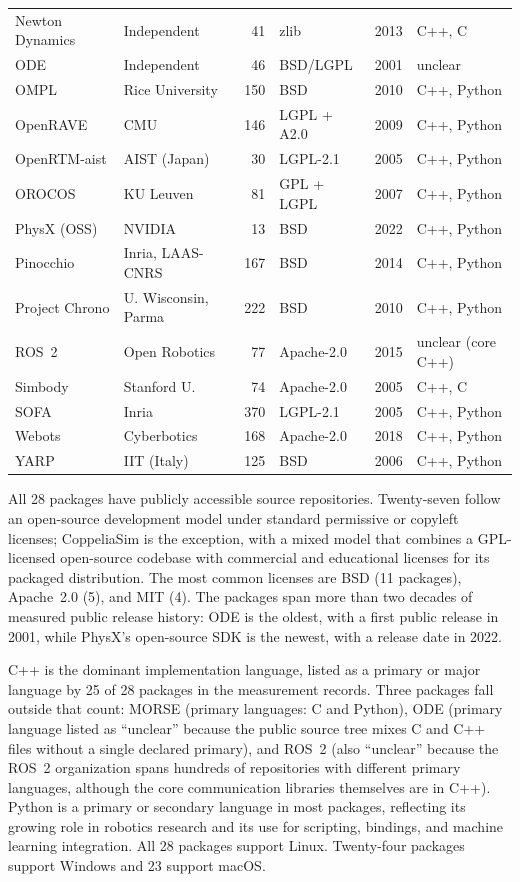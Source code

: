 \begin{longtable}{@{}P{2.2cm}P{2.7cm}rP{1.7cm}P{1.3cm}P{1.8cm}@{}}
Newton Dynamics & Independent & 41 & zlib & 2013 & C++, C \\
ODE & Independent & 46 & BSD/\allowbreak{}LGPL & 2001 & unclear \\
OMPL & Rice University & 150 & BSD & 2010 & C++, Python \\
OpenRAVE & CMU & 146 & LGPL + A2.0 & 2009 & C++, Python \\
OpenRTM-aist & AIST (Japan) & 30 & LGPL-2.1 & 2005 & C++, Python \\
OROCOS & KU Leuven & 81 & GPL + LGPL & 2007 & C++, Python \\
PhysX (OSS) & NVIDIA & 13 & BSD & 2022 & C++, Python \\
Pinocchio & Inria, LAAS-CNRS & 167 & BSD & 2014 & C++, Python \\
Project Chrono & U. Wisconsin, Parma & 222 & BSD & 2010 & C++, Python \\
ROS~2 & Open Robotics & 77 & Apache-2.0 & 2015 & unclear (core C++) \\
Simbody & Stanford U. & 74 & Apache-2.0 & 2005 & C++, C \\
SOFA & Inria & 370 & LGPL-2.1 & 2005 & C++, Python \\
Webots & Cyberbotics & 168 & Apache-2.0 & 2018 & C++, Python \\
YARP & IIT (Italy) & 125 & BSD & 2006 & C++, Python \\
\end{longtable}
\endgroup

All 28 packages have publicly accessible source repositories. Twenty-seven follow an open-source development model under standard permissive or copyleft licenses; CoppeliaSim is the exception, with a mixed model that combines a GPL-licensed open-source codebase with commercial and educational licenses for its packaged distribution. The most common licenses are BSD (11 packages), Apache~2.0 (5), and MIT (4). The packages span more than two decades of measured public release history: ODE is the oldest, with a first public release in 2001, while PhysX's open-source SDK is the newest, with a release date in 2022.

C++ is the dominant implementation language, listed as a primary or major language by 25 of 28 packages in the measurement records. Three packages fall outside that count: MORSE (primary languages: C and Python), ODE (primary language listed as ``unclear'' because the public source tree mixes C and C++ files without a single declared primary), and ROS~2 (also ``unclear'' because the ROS~2 organization spans hundreds of repositories with different primary languages, although the core communication libraries themselves are in C++). Python is a primary or secondary language in most packages, reflecting its growing role in robotics research and its use for scripting, bindings, and machine learning integration. All 28 packages support Linux. Twenty-four packages support Windows and 23 support macOS.

